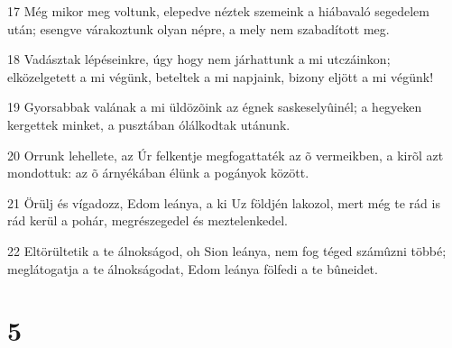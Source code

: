 \par 17 Még mikor meg voltunk, elepedve néztek szemeink a hiábavaló segedelem után; esengve várakoztunk olyan népre, a mely nem szabadított meg.
\par 18 Vadásztak lépéseinkre, úgy hogy nem járhattunk a mi utczáinkon; elközelgetett a mi végünk, beteltek a mi napjaink, bizony eljött a mi végünk!
\par 19 Gyorsabbak valának a mi üldözõink az égnek saskeselyûinél; a hegyeken kergettek minket, a pusztában ólálkodtak utánunk.
\par 20 Orrunk lehellete, az Úr felkentje megfogattaték az õ vermeikben, a kirõl azt mondottuk: az õ árnyékában élünk a pogányok között.
\par 21 Örülj és vígadozz, Edom leánya, a ki Uz földjén lakozol, mert még te rád is rád kerül a pohár, megrészegedel és meztelenkedel.
\par 22 Eltörültetik a te álnokságod, oh Sion leánya, nem fog téged számûzni többé; meglátogatja a te álnokságodat, Edom leánya fölfedi a te bûneidet.

\chapter{5}

